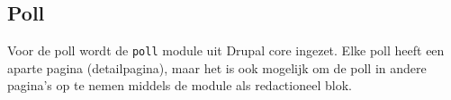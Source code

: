 \subsection{Poll}

Voor de poll wordt de \texttt{poll} module uit Drupal core ingezet.
Elke poll heeft een aparte pagina (detailpagina), maar het is ook mogelijk om de poll in andere pagina's op te nemen middels de  module als redactioneel blok.